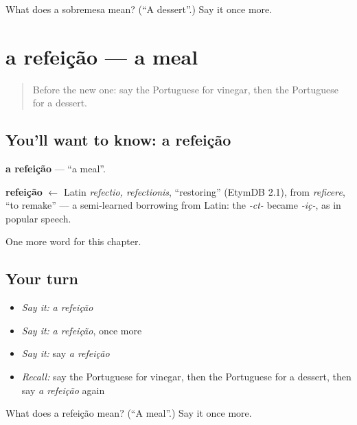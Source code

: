 \begin{tcolorbox}[breakable,colback=teal!4,colframe=teal!35!black,title={Before you move on}]
What does a sobremesa mean? (\textquotedblleft{}A dessert\textquotedblright{}.) Say it once more.
\end{tcolorbox}
\section[a refeição]{a refeição — a meal}

\label{lesson:PT-C107-refeicao}



\begin{quote}
Before the new one: say the Portuguese for vinegar, then the Portuguese for a dessert.
\end{quote}

\subsection*{You'll want to know: a refeição}
\textbf{a refeição} — \textquotedblleft{}a meal\textquotedblright{}.

\begin{cousinweb}
\textbf{refeição} $\leftarrow$ Latin \emph{refectio, refectionis}, \textquotedblleft{}restoring\textquotedblright{} (EtymDB 2.1), from \emph{reficere}, \textquotedblleft{}to remake\textquotedblright{} — a semi-learned borrowing from Latin: the \emph{-ct-} became \emph{-iç-}, as in popular speech.
\end{cousinweb}

\begin{grammarlens}[title={What you've built}]
One more word for this chapter.
\end{grammarlens}

\subsection*{Your turn}
\begin{itemize}
\raggedright
  \item \emph{Say it:} \emph{a refeição}
  \item \emph{Say it:} \emph{a refeição}, once more
  \item \emph{Say it:} say \emph{a refeição}
  \item \emph{Recall:} say the Portuguese for vinegar, then the Portuguese for a dessert, then say \emph{a refeição} again
\end{itemize}

\begin{tcolorbox}[breakable,colback=teal!4,colframe=teal!35!black,title={Before you move on}]
What does a refeição mean? (\textquotedblleft{}A meal\textquotedblright{}.) Say it once more.
\end{tcolorbox}
